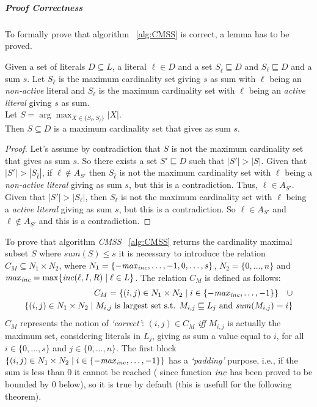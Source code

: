 \subparagraph{Proof Correctness}
To formally prove that algorithm ~\ref{alg:CMSS} is correct, a lemma 
has to be proved.
\begin{lemma}
    Given a set of literals $D \subseteq L$, a literal $\ell \in D$ and a set $S_{\overline{\ell}} \sqsubseteq D$
    and $S_{\ell} \sqsubseteq D$ and a sum $s$.
    Let $S_{\overline{\ell}}$ is the maximum cardinality set giving $s$ as sum with $\ell$ being an \textit{non-active} literal
    and $S_{\ell}$ is the maximum cardinality set with $\ell$ being an \textit{active literal} giving $s$  as sum.\\
    Let $ S = \arg\max_{X \in \{S_{\ell}, S_{\overline{\ell}}\}} |X| $. \\ 
    Then $S \subseteq D$ is a maximum cardinality set that gives as sum $s$.
    \label{lemma:cmin}
\end{lemma}

\begin{proof}
    Let's assume by contradiction that $S$ is not the maximum cardinality set that gives as sum $s$.
    So there exists a set $S' \sqsubseteq D$ such that $|S'| > |S|$.
    Given that $|S'| > |S_{\overline{\ell}}|$, if  $\ell \not\in A_{S'}$ then $S_{\overline{\ell}}$ 
    is not the maximum cardinality set 
    with $\ell$ being a \textit{non-active literal} giving as sum $s$, but this is a contradiction.
    Thus, $\ell \in A_{S'}$. Given that $|S'| > |S_{\ell}|$, then $S_{\ell}$ is not the maximum cardinality set 
    with $\ell$ being a \textit{active literal} giving as sum $s$, but this is a contradiction.
    So $\ell \in A_{S'}$ and $ \ell \not\in A_{S'}$ and this is a contradiction.
\end{proof}



To prove that algorithm \textit{CMSS} ~\ref{alg:CMSS} returns the cardinality maximal subset $S$ 
where  $\mathit{sum}(S) \le s$ it is necessary to introduce the
relation $C_M \subseteq N_1 \times N_2$, where $N_1 = \{-\mathit{max}_{\mathit{inc}}, \hdots, -1, 0, \hdots, s\}$,
$N_2 = \{0, \hdots, n\}$ and $\mathit{max}_{\mathit{inc}} = \max \{ \mathit{inc}(\ell,I,R) \mid \ell \in L\}$.
The relation $C_M$ is defined as follows:
\begin{align*}
    C_M = \{ (i,j) \in N_1 \times N_2 \mid i \in \{-\mathit{max}_{\mathit{inc}}, \hdots, -1\}\} \quad  \cup \\
    \{(i,j) \in N_1 \times N_2 \mid M_{i,j} \text{ is largest set s.t. } M_{i,j} \sqsubseteq L_j \text{ and } 
    \mathit{sum}(M_{i,j}) = i\}
\end{align*}
$C_M$ represents the notion of \textit{`correct'}: $(i,j) \in C_M$ \textit{iff}
$M_{i,j}$ is actually the maximum set, considering literals in $L_j$,
giving as sum a value equal to $i$, for all $i \in \{0, \hdots, s\}$
and $j \in \{0, \hdots, n\}$.
The first block $\{ (i,j) \in N_1 \times N_2 \mid i \in \{-\mathit{max}_{\mathit{inc}}, \hdots, -1\}\}$
has a \textit{`padding'} purpose, i.e., if the sum is less than 0 it cannot be reached ( since function $\mathit{inc}$
has been proved to be bounded by 0 below), so it is true by default (this is usefull for the following
theorem).


